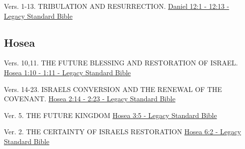 \documentclass[
  ignorenonframetext,
]{beamer}
\begin{document}
\begin{frame}{12}
\label{section-110}
\begin{block}{Vers. 1-13. TRIBULATION AND RESURRECTION.}
\label{vers.-1-13.-tribulation-and-resurrection.}
\href{https://read.lsbible.org/?q=dan12\%3A1-13}{Daniel 12:1 - 12:13 -
Legacy Standard Bible}
\end{block}
\end{frame}

\subsection{Hosea}\label{hosea}

\begin{frame}{1}
\label{section-111}
\begin{block}{Vers. 10,11. THE FUTURE BLESSING AND RESTORATION OF
ISRAEL.}
\label{vers.-1011.-the-future-blessing-and-restoration-of-israel.}
\href{https://read.lsbible.org/?q=hos1\%3A10-11}{Hosea 1:10 - 1:11 -
Legacy Standard Bible}
\end{block}
\end{frame}

\begin{frame}{2}
\label{section-112}
\begin{block}{Vers. 14-23. ISRAEL\textquotesingle S CONVERSION AND THE
RENEWAL OF THE COVENANT.}
\label{vers.-14-23.-israels-conversion-and-the-renewal-of-the-covenant.}
\href{https://read.lsbible.org/?q=hos2\%3A14-23}{Hosea 2:14 - 2:23 -
Legacy Standard Bible}
\end{block}
\end{frame}

\begin{frame}{3}
\label{section-113}
\begin{block}{Ver. 5. THE FUTURE KINGDOM}
\label{ver.-5.-the-future-kingdom}
\href{https://read.lsbible.org/?q=hos3\%3A5}{Hosea 3:5 - Legacy Standard
Bible}
\end{block}
\end{frame}

\begin{frame}{6}
\label{section-114}
\begin{block}{Ver. 2. THE CERTAINTY OF ISRAEL\textquotesingle S
RESTORATION}
\label{ver.-2.-the-certainty-of-israels-restoration}
\href{https://read.lsbible.org/?q=hos6\%3A2}{Hosea 6:2 - Legacy Standard
Bible}
\end{block}
\end{frame}
\end{document}
